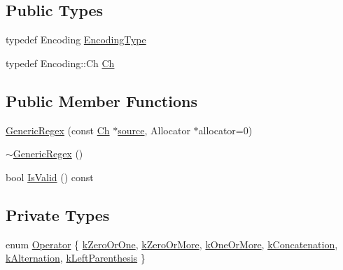 \subsection*{Public Types}
\begin{DoxyCompactItemize}
\item 
typedef Encoding \hyperlink{classinternal_1_1GenericRegex_a8d0eb2f6a71868b2a8f03382b7836d30}{Encoding\+Type}
\item 
typedef Encoding\+::\+Ch \hyperlink{classinternal_1_1GenericRegex_a44e1a86ec27e1c5628a7d91c8c3daace}{Ch}
\end{DoxyCompactItemize}
\subsection*{Public Member Functions}
\begin{DoxyCompactItemize}
\item 
\hyperlink{classinternal_1_1GenericRegex_a35c3a49bc4545a991ab039858227df0f}{Generic\+Regex} (const \hyperlink{classinternal_1_1GenericRegex_a44e1a86ec27e1c5628a7d91c8c3daace}{Ch} $\ast$\hyperlink{pointer_8h_adb82dfe18535e9a30aa97d275f82bd55}{source}, Allocator $\ast$allocator=0)
\item 
\hyperlink{classinternal_1_1GenericRegex_a6a4956c0391bccbf8580b2e047d5bc35}{$\sim$\+Generic\+Regex} ()
\item 
bool \hyperlink{classinternal_1_1GenericRegex_a34ddb18fa3a2c70203d0fb740443c2a8}{Is\+Valid} () const
\end{DoxyCompactItemize}
\subsection*{Private Types}
\begin{DoxyCompactItemize}
\item 
enum \hyperlink{classinternal_1_1GenericRegex_acd9c0338546415c6d6dabdb76f8be673}{Operator} \{ \newline
\hyperlink{classinternal_1_1GenericRegex_acd9c0338546415c6d6dabdb76f8be673ad4577594ddb5fee3be7138b0759c35b3}{k\+Zero\+Or\+One}, 
\hyperlink{classinternal_1_1GenericRegex_acd9c0338546415c6d6dabdb76f8be673aa4482f5484f4db6675095aaec3286e4f}{k\+Zero\+Or\+More}, 
\hyperlink{classinternal_1_1GenericRegex_acd9c0338546415c6d6dabdb76f8be673a5640dadf6c1cff543463686f2f2903e3}{k\+One\+Or\+More}, 
\hyperlink{classinternal_1_1GenericRegex_acd9c0338546415c6d6dabdb76f8be673a989378c9dfab87e3faf7b5e7db8885a2}{k\+Concatenation}, 
\newline
\hyperlink{classinternal_1_1GenericRegex_acd9c0338546415c6d6dabdb76f8be673a6c251a26f84dc6bc21717ef5fe8504d4}{k\+Alternation}, 
\hyperlink{classinternal_1_1GenericRegex_acd9c0338546415c6d6dabdb76f8be673ae2f7e4cfde06337266fa1ac3a8b47d54}{k\+Left\+Parenthesis}
 \}
\end{DoxyCompactItemize}
